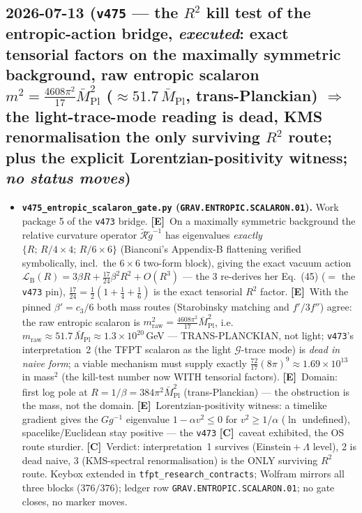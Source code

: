 \documentclass[11pt]{article}
\providecommand{\mE}{\textbf{[E]}}\providecommand{\mC}{\textbf{[C]}}
\providecommand{\cthree}{c_3}\providecommand{\phiz}{\varphi_0^{\mathrm{ret}}}
\providecommand{\Mbar}{\bar M_{\mathrm{Pl}}}\providecommand{\Z}{\mathbb{Z}}\providecommand{\PP}{\mathbb{P}}
\begin{document}
\subsection*{2026-07-13 (\texttt{v475} --- the $R^2$ kill test of the entropic-action bridge, \emph{executed}: exact tensorial factors on the maximally symmetric background, raw entropic scalaron $m^2=\tfrac{4608\pi^2}{17}\Mbar^2$ ($\approx51.7\,\Mbar$, trans-Planckian) $\Rightarrow$ the light-trace-mode reading is dead, KMS renormalisation the only surviving $R^2$ route; plus the explicit Lorentzian-positivity witness; \emph{no status moves})}
\begin{itemize}[leftmargin=1.5em]
\item \textbf{\texttt{v475\_entropic\_scalaron\_gate.py} (\texttt{GRAV.ENTROPIC.SCALARON.01}).} Work
package 5 of the \texttt{v473} bridge. \mE\ On a maximally symmetric background the relative curvature
operator $\widetilde{\mathcal R}\widetilde g^{-1}$ has eigenvalues \emph{exactly}
$\{R;\,R/4{\times}4;\,R/6{\times}6\}$ (Bianconi's Appendix-B flattening verified symbolically,
incl.\ the $6{\times}6$ two-form block), giving the exact vacuum action
$\mathcal L_{\mathrm B}(R)=3\beta R+\tfrac{17}{24}\beta^2R^2+O(R^3)$ --- the $3$ re-derives her
Eq.~(45) ($=$ the \texttt{v473} pin), $\tfrac{17}{24}{=}\tfrac12(1{+}\tfrac14{+}\tfrac16)$ is the exact
tensorial $R^2$ factor. \mE\ With the pinned $\beta'{=}\cthree/6$ both mass routes (Starobinsky
matching and $f'/3f''$) agree: the raw entropic scalaron is $m_{\mathrm{raw}}^2{=}\tfrac{4608\pi^2}{17}
\Mbar^2$, i.e.\ $m_{\mathrm{raw}}{\approx}51.7\,\Mbar{\approx}1.3{\times}10^{20}$\,GeV ---
TRANS-PLANCKIAN, not light; \texttt{v473}'s interpretation~2 (the TFPT scalaron as the light
$\mathcal G$-trace mode) is \emph{dead in naive form}; a viable mechanism must supply exactly
$\tfrac{72}{17}(8\pi)^9{\approx}1.69{\times}10^{13}$ in mass$^2$ (the kill-test number now WITH
tensorial factors). \mE\ Domain: first log pole at $R{=}1/\beta{=}384\pi^2\Mbar^2$ (trans-Planckian)
--- the obstruction is the mass, not the domain. \mE\ Lorentzian-positivity witness: a timelike
gradient gives the $Gg^{-1}$ eigenvalue $1-\alpha v^2\le0$ for $v^2\ge1/\alpha$ ($\ln$ undefined),
spacelike/Euclidean stay positive --- the \texttt{v473} \mC\ caveat exhibited, the OS route sturdier.
\mC\ Verdict: interpretation~1 survives (Einstein${}+\Lambda$ level), 2 is dead naive, 3 (KMS-spectral
renormalisation) is the ONLY surviving $R^2$ route. Keybox extended in
\texttt{tfpt\_research\_contracts}; Wolfram mirrors all three blocks ($376/376$); ledger row
\texttt{GRAV.ENTROPIC.SCALARON.01}; no gate closes, no marker moves.
\end{itemize}
\end{document}
